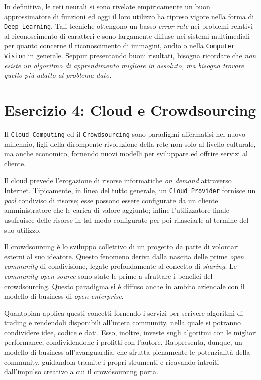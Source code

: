 			In definitiva, le reti neurali si sono rivelate empiricamente un buon approssimatore di funzioni ed oggi il loro utilizzo ha ripreso vigore nella forma di \texttt{Deep Learning}. Tali tecniche ottengono un basso \emph{error rate} nei problemi relativi al riconoscimento di caratteri e sono largamente diffuse nei sistemi multimediali per quanto concerne il riconoscimento di immagini, audio o nella \texttt{Computer Vision} in generale. Seppur presentando buoni risultati, bisogna ricordare che \emph{non esiste un algoritmo di apprendimento migliore in assoluto, ma bisogna trovare quello più adatto al problema dato.}
			
		\section{Esercizio 4: Cloud e Crowdsourcing}
			\label{sec:es4}
			Il \texttt{Cloud Computing} ed il \texttt{Crowdsourcing} sono paradigmi affermatisi nel nuovo millennio, figli della dirompente rivoluzione della rete non solo al livello culturale, ma anche economico, fornendo nuovi modelli per sviluppare ed offrire servizi al cliente.\par
			Il cloud prevede l'erogazione di risorse informatiche \emph{on demand} attraverso Internet. Tipicamente, in linea del tutto generale, un \texttt{Cloud Provider} fornisce un \emph{pool} condiviso di risorse; esse possono essere configurate da un cliente amministratore che le carica di valore aggiunto; infine l'utilizzatore finale usufruisce delle risorse in tal modo configurate per poi rilasciarle al termine del suo utilizzo.\par
			Il crowdsourcing è lo sviluppo collettivo di un progetto da parte di volontari esterni al suo ideatore. Questo fenomeno deriva dalla nascita delle prime \emph{open community} di condivisione, legate profondamente al concetto di \emph{sharing}. Le \emph{community open source} sono state le prime a sfruttare i benefici del crowdsourcing. Questo paradigma si è diffuso anche in ambito aziendale con il modello di business di \emph{open enterprise}.\par
			Quantopian applica questi concetti fornendo i servizi per scrivere algoritmi di trading e rendendoli disponibili all'intera community, nella quale si potranno condividere idee, codice e dati. Esso, inoltre, investe sugli algoritmi con le migliori performance, condividendone i profitti con l'autore. Rappresenta, dunque, un modello di business all'avanguardia, che sfrutta pienamente le potenzialità della community, guidandola tramite i propri strumenti e ricavando introiti dall'impulso creativo a cui il crowdsourcing porta.
